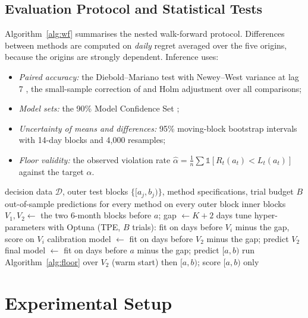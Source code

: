 \documentclass{ieeeaccess}
\begin{document}
\subsection{Evaluation Protocol and Statistical Tests}
Algorithm~\ref{alg:wf} summarises the nested walk-forward protocol. Differences between methods are computed on \emph{daily} regret averaged over the five origins, because the origins are strongly dependent. Inference uses:
\begin{itemize}
\item \emph{Paired accuracy:} the Diebold--Mariano test \cite{diebold1995} with Newey--West variance at lag 7 \cite{newey1987}, the small-sample correction of \cite{harvey1997} and Holm adjustment \cite{holm1979} over all comparisons;
\item \emph{Model sets:} the 90\% Model Confidence Set \cite{hansen2011};
\item \emph{Uncertainty of means and differences:} 95\% moving-block bootstrap intervals \cite{kunsch1989} with 14-day blocks and 4{,}000 resamples;
\item \emph{Floor validity:} the observed violation rate $\hat\alpha=\frac1n\sum\mathbb 1[R_t(a_t)<L_t(a_t)]$ against the target $\alpha$.
\end{itemize}

\begin{algorithm}[!t]
\caption{Nested Walk-Forward Training, Calibration and Prediction}
\label{alg:wf}
\begin{algorithmic}[1]
\REQUIRE decision data $\mathcal D$, outer test blocks $\{[a_j,b_j)\}$, method specifications, trial budget $B$
\ENSURE out-of-sample predictions for every method on every outer block
\FOR{each outer block $[a,b)$}
\STATE inner blocks $V_1,V_2\leftarrow$ the two 6-month blocks before $a$; gap $\leftarrow K+2$ days
\STATE tune hyper-parameters with Optuna (TPE, $B$ trials): fit on days before $V_i$ minus the gap, score on $V_i$
\STATE calibration model $\leftarrow$ fit on days before $V_2$ minus the gap; predict $V_2$
\STATE final model $\leftarrow$ fit on days before $a$ minus the gap; predict $[a,b)$
\STATE run Algorithm~\ref{alg:floor} over $V_2$ (warm start) then $[a,b)$; score $[a,b)$ only
\ENDFOR
\ENDFOR
\end{algorithmic}
\end{algorithm}

\section{Experimental Setup}
\label{sec:setup}
\end{document}
